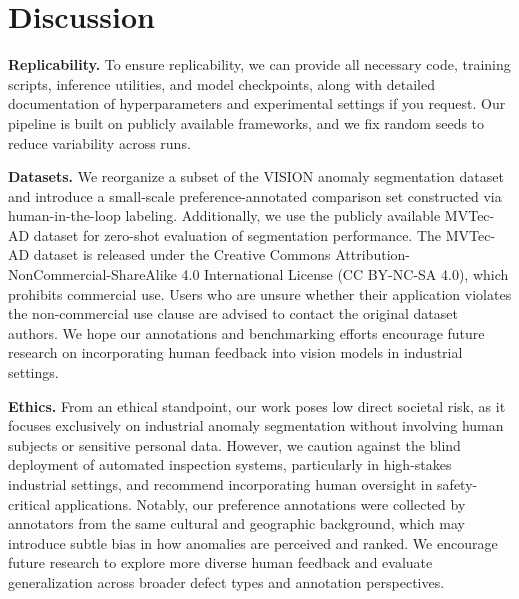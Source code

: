 \documentclass[11pt]{article}
\begin{document}




\section{Discussion} 
\textbf{Replicability.} To ensure replicability, we can provide all necessary code, training scripts, inference utilities, and model checkpoints, along with detailed documentation of hyperparameters and experimental settings if you request. Our pipeline is built on publicly available frameworks, and we fix random seeds to reduce variability across runs. 

\textbf{Datasets.} We reorganize a subset of the VISION anomaly segmentation dataset and introduce a small-scale preference-annotated comparison set constructed via human-in-the-loop labeling. Additionally, we use the publicly available MVTec-AD dataset for zero-shot evaluation of segmentation performance. The MVTec-AD dataset is released under the Creative Commons Attribution-NonCommercial-ShareAlike 4.0 International License (CC BY-NC-SA 4.0), which prohibits commercial use. Users who are unsure whether their application violates the non-commercial use clause are advised to contact the original dataset authors. We hope our annotations and benchmarking efforts encourage future research on incorporating human feedback into vision models in industrial settings.

\textbf{Ethics.} From an ethical standpoint, our work poses low direct societal risk, as it focuses exclusively on industrial anomaly segmentation without involving human subjects or sensitive personal data. However, we caution against the blind deployment of automated inspection systems, particularly in high-stakes industrial settings, and recommend incorporating human oversight in safety-critical applications. Notably, our preference annotations were collected by annotators from the same cultural and geographic background, which may introduce subtle bias in how anomalies are perceived and ranked. We encourage future research to explore more diverse human feedback and evaluate generalization across broader defect types and annotation perspectives.
\end{document}
